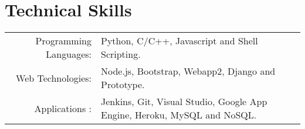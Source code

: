 \section{Technical Skills}
\renewcommand{\arraystretch}{1}%
\begin{tabular}{rl}

Programming Languages: &  Python, C/C++, Javascript and Shell Scripting.\\
Web Technologies: & Node.js, Bootstrap, Webapp2, Django and Prototype.\\
Applications : & Jenkins, Git, Visual Studio, Google App Engine, Heroku, MySQL and NoSQL.\\
\end{tabular}
\vspace{5pt}
